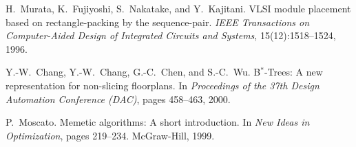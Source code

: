 \documentclass{article}
\begin{document}
\begin{thebibliography}{99}
H.~Murata, K.~Fujiyoshi, S.~Nakatake, and Y.~Kajitani.
\newblock VLSI module placement based on rectangle-packing by the sequence-pair.
\newblock \emph{IEEE Transactions on Computer-Aided Design of Integrated Circuits and Systems}, 15(12):1518--1524, 1996.

Y.-W.~Chang, Y.-W.~Chang, G.-C.~Chen, and S.-C.~Wu.
\newblock B$^\ast$-Trees: A new representation for non-slicing floorplans.
\newblock In \emph{Proceedings of the 37th Design Automation Conference (DAC)}, pages 458--463, 2000.

P.~Moscato.
\newblock Memetic algorithms: A short introduction.
\newblock In \emph{New Ideas in Optimization}, pages 219--234. McGraw-Hill, 1999.

\end{thebibliography}
\end{document}
